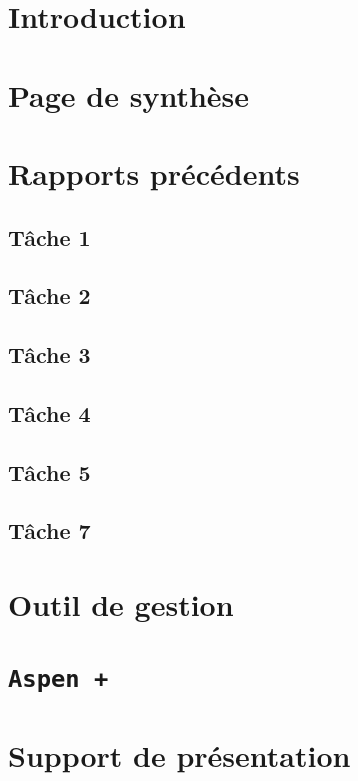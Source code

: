 \documentclass[a4paper,oneside,12pt]{report}
\begin{document}


\chapter{Introduction}
\chapter{Page de synthèse}

\appendix
\chapter{Rapports précédents}

\section{T\^ache 1}
%

\section{T\^ache 2}
%

\section{T\^ache 3}

\section{T\^ache 4}
%

\section{T\^ache 5}
%

\section{T\^ache 7}
%

\chapter{Outil de gestion}

\chapter{\texttt{Aspen +}}

\chapter{Support de présentation}
\end{document}
